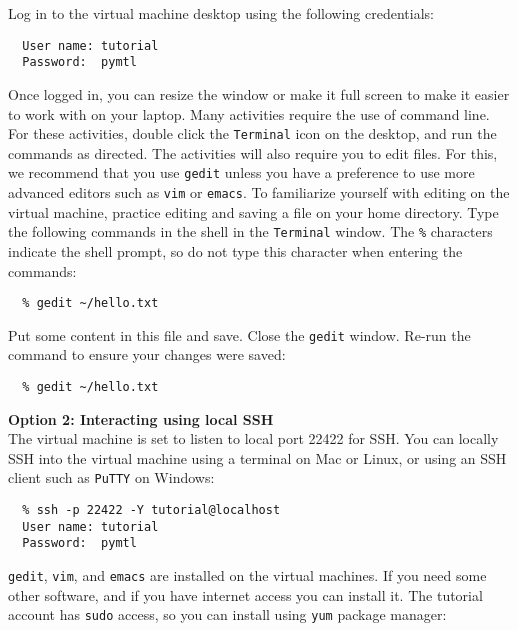 \documentclass[11pt]{article}
\begin{document}
Log in to the virtual machine desktop using the following credentials:

\begin{verbatim}
  User name: tutorial
  Password:  pymtl
\end{verbatim}

Once logged in, you can resize the window or make it full screen to make
it easier to work with on your laptop. Many activities require the use of
command line. For these activities, double click the \texttt{Terminal}
icon on the desktop, and run the commands as directed. The activities will
also require you to edit files. For this, we recommend that you use
\texttt{gedit} unless you have a preference to use more advanced editors
such as \texttt{vim} or \texttt{emacs}. To familiarize yourself with
editing on the virtual machine, practice editing and saving a file on your
home directory. Type the following commands in the shell in the
\texttt{Terminal} window. The \texttt{\%} characters indicate the shell
prompt, so do not type this character when entering the commands:

\begin{verbatim}
  % gedit ~/hello.txt
\end{verbatim}

Put some content in this file and save. Close the \texttt{gedit} window.
Re-run the command to ensure your changes were saved:

\begin{verbatim}
  % gedit ~/hello.txt
\end{verbatim}

{\large \textbf{Option 2: Interacting using local SSH}}\\

The virtual machine is set to listen to local port 22422 for SSH. You can
locally SSH into the virtual machine using a terminal on Mac or Linux, or
using an SSH client such as \texttt{PuTTY} on Windows:

\begin{verbatim}
  % ssh -p 22422 -Y tutorial@localhost
  User name: tutorial
  Password:  pymtl
\end{verbatim}

\texttt{gedit}, \texttt{vim}, and \texttt{emacs} are installed on the
virtual machines. If you need some other software, and if you have
internet access you can install it.  The tutorial account has
\texttt{sudo} access, so you can install using \texttt{yum} package
manager:
\end{document}
